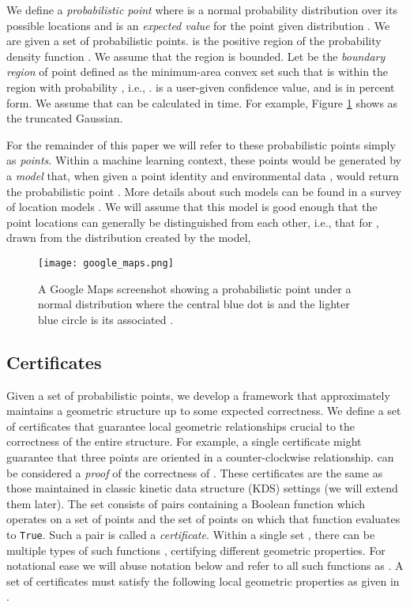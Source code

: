 \documentclass[11pt]{article}
\begin{document}
We define a \emph{probabilistic point}  where  is a normal probability distribution over its possible locations and  is an \emph{expected value} for the point  given distribution .  We are given a set  of  probabilistic points. 
 is the positive region of the probability density function .  We assume that the region  is bounded.  Let  be the \emph{boundary region} of point  defined as the minimum-area convex set such that  is within the region with probability , i.e.,
.   is a user-given confidence value, and  is  in percent form.  We assume that  can be calculated in  time.  For example, Figure \ref{fig:google_maps} shows  as the truncated Gaussian.

For the remainder of this paper we will refer to these probabilistic points  simply as \emph{points}. 
Within a machine learning context, these points would be generated by a \emph{model}  that, when given a point identity  and environmental data , would return the probabilistic point .  More details about such models can be found in a survey of location models \cite{Hightower01Location}.  We will assume that this model is good enough that the point locations can generally be distinguished from each other, i.e., that for , drawn from the distribution created by the model,


\begin{figure}
\begin{center}
 \texttt{[image: google\_maps.png]}
\caption{A Google Maps screenshot showing a probabilistic point  under a normal distribution  where the central blue dot is  and the lighter blue circle is its associated .}
\label{fig:google_maps}
\vspace{-0.1in}
\end{center}
\end{figure}

\subsection{Certificates}
\label{intro:certificates}
 Given a set of probabilistic points, we develop a framework that approximately maintains a geometric structure  up to some expected correctness. We define a set of certificates  that guarantee local geometric relationships crucial to the correctness of the entire structure.  For example, a single certificate might guarantee that three points are oriented in a counter-clockwise relationship.   can be considered a \emph{proof} of the correctness of . These certificates are the same as those  maintained in classic kinetic data structure (KDS) settings \cite{Basch99MobileData} (we will extend them later).  The set  consists of pairs containing a Boolean function  which operates on a set of points  and the set of points  on which that function evaluates to \texttt{True}.  Such a pair  is called a \emph{certificate}.  Within a single set , there can be multiple types of such functions , certifying different geometric properties.  For notational ease we will abuse notation below and refer to all such functions as .  A set of certificates  must satisfy the following local geometric properties  as given in \cite{Basch99MobileData}.
\end{document}
